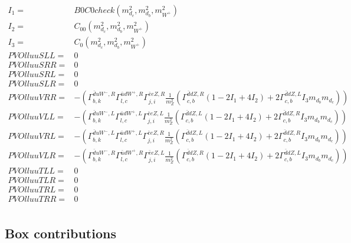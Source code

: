 \documentclass[A4,landscape]{article}
\begin{document}
\begin{align} 
I_1= & B0C0check(m^2_{d_{{c}}}, m^2_{d_{{b}}}, m^2_{W^+}) \\ 
I_2= & C_{00}(m^2_{d_{{c}}}, m^2_{d_{{b}}}, m^2_{W^+}) \\ 
I_3= & C_0(m^2_{d_{{c}}}, m^2_{d_{{b}}}, m^2_{W^+}) \\ 
  PVOlluuSLL= & 0 \\ 
  PVOlluuSRR= & 0 \\ 
  PVOlluuSRL= & 0 \\ 
  PVOlluuSLR= & 0 \\ 
  PVOlluuVRR= & -( \Gamma^{\bar{d}u W^-,R}_{b, k} \Gamma^{\bar{u}d W^+ ,R}_{l, c} \Gamma^{\bar{e}e Z ,R}_{j, i} \frac{1}{m^2_{Z}} (\Gamma^{\bar{d}d Z ,R}_{c, b} (1 - 2 I_1 + 4 I_2) + 2 \Gamma^{\bar{d}d Z ,L}_{c, b} I_3 m_{d_{{b}}} m_{d_{{c}}})) \\ 
  PVOlluuVLL= & -( \Gamma^{\bar{d}u W^-,L}_{b, k} \Gamma^{\bar{u}d W^+ ,L}_{l, c} \Gamma^{\bar{e}e Z ,L}_{j, i} \frac{1}{m^2_{Z}} (\Gamma^{\bar{d}d Z ,L}_{c, b} (1 - 2 I_1 + 4 I_2) + 2 \Gamma^{\bar{d}d Z ,R}_{c, b} I_3 m_{d_{{b}}} m_{d_{{c}}})) \\ 
  PVOlluuVRL= & -( \Gamma^{\bar{d}u W^-,L}_{b, k} \Gamma^{\bar{u}d W^+ ,L}_{l, c} \Gamma^{\bar{e}e Z ,R}_{j, i} \frac{1}{m^2_{Z}} (\Gamma^{\bar{d}d Z ,L}_{c, b} (1 - 2 I_1 + 4 I_2) + 2 \Gamma^{\bar{d}d Z ,R}_{c, b} I_3 m_{d_{{b}}} m_{d_{{c}}})) \\ 
  PVOlluuVLR= & -( \Gamma^{\bar{d}u W^-,R}_{b, k} \Gamma^{\bar{u}d W^+ ,R}_{l, c} \Gamma^{\bar{e}e Z ,L}_{j, i} \frac{1}{m^2_{Z}} (\Gamma^{\bar{d}d Z ,R}_{c, b} (1 - 2 I_1 + 4 I_2) + 2 \Gamma^{\bar{d}d Z ,L}_{c, b} I_3 m_{d_{{b}}} m_{d_{{c}}})) \\ 
  PVOlluuTLL= & 0 \\ 
  PVOlluuTLR= & 0 \\ 
  PVOlluuTRL= & 0 \\ 
  PVOlluuTRR= & 0 \\ 
\end{align} 
\subsection{Box contributions} 
\end{document}
